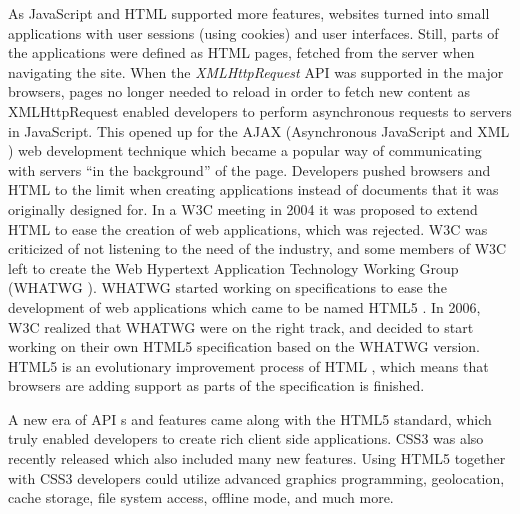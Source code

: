 \documentclass[a4paper,11pt]{kth-mag}
\newcommand\abbr[2][]{\uppercase{#2}\ifthenelse{\equal{#1}{}}%
                     {}{#1}}
\begin{document}
        As JavaScript and \abbr{html} supported more features, websites turned into small applications with user sessions (using cookies) and user interfaces.
        Still, parts of the applications were defined as \abbr{html} pages, fetched from the server when navigating the site.
        When the \emph{XMLHttpRequest} \abbr{api} was supported in the major browsers, pages no longer needed to reload in order to fetch new content as XMLHttpRequest enabled developers to perform asynchronous requests to servers in JavaScript.
        This opened up for the \abbr{ajax} (Asynchronous JavaScript and \abbr{xml}) web development technique which became a popular way of communicating with servers ``in the background'' of the page.
        Developers pushed browsers and \abbr{html} to the limit when creating applications instead of documents that it was originally designed for.
        In a \abbr{w3c} meeting in 2004 it was proposed to extend \abbr{html} to ease the creation of web applications, which was rejected.
        \abbr{w3c} was criticized of not listening to the need of the industry, and some members of \abbr{w3c} left to create the Web Hypertext Application Technology Working Group (\abbr{whatwg}).
        \abbr{whatwg} started working on specifications to ease the development of web applications which came to be named \abbr{html5}.
        In 2006, \abbr{w3c} realized that \abbr{whatwg} were on the right track, and decided to start working on their own \abbr{html5} specification based on the \abbr{whatwg} version.
        \abbr{html5} is an evolutionary improvement process of \abbr{html}, which means that browsers are adding support as parts of the specification is finished.

        A new era of \abbr[s]{api} and features came along with the \abbr{html5} standard, which truly enabled developers to create rich client side applications.
        \abbr{css3} was also recently released which also included many new features.
        Using \abbr{html5} together with \abbr{css3} developers could utilize advanced graphics programming, geolocation, cache storage, file system access, offline mode, and much more.

\end{document}
